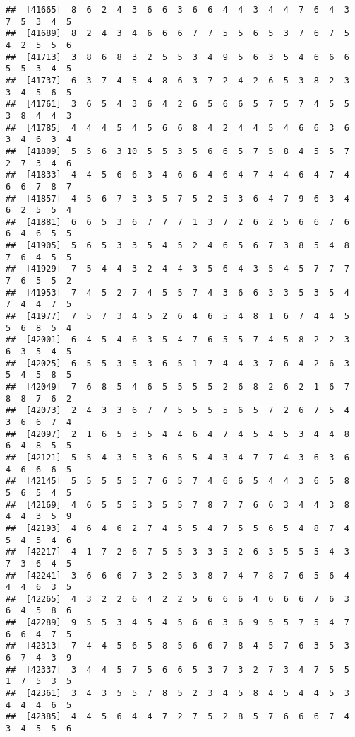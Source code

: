 \documentclass[
]{book}
\begin{document}
\begin{verbatim}
##  [41665]  8  6  2  4  3  6  6  3  6  6  4  4  3  4  4  7  6  4  3  7  5  3  4  5
##  [41689]  8  2  4  3  4  6  6  6  7  7  5  5  6  5  3  7  6  7  5  4  2  5  5  6
##  [41713]  3  8  6  8  3  2  5  5  3  4  9  5  6  3  5  4  6  6  6  5  5  3  4  5
##  [41737]  6  3  7  4  5  4  8  6  3  7  2  4  2  6  5  3  8  2  3  3  4  5  6  5
##  [41761]  3  6  5  4  3  6  4  2  6  5  6  6  5  7  5  7  4  5  5  3  8  4  4  3
##  [41785]  4  4  4  5  4  5  6  6  8  4  2  4  4  5  4  6  6  3  6  3  4  6  3  4
##  [41809]  5  5  6  3 10  5  5  3  5  6  6  5  7  5  8  4  5  5  7  2  7  3  4  6
##  [41833]  4  4  5  6  6  3  4  6  6  4  6  4  7  4  4  6  4  7  4  6  6  7  8  7
##  [41857]  4  5  6  7  3  3  5  7  5  2  5  3  6  4  7  9  6  3  4  6  2  5  5  4
##  [41881]  6  6  5  3  6  7  7  7  1  3  7  2  6  2  5  6  6  7  6  6  4  6  5  5
##  [41905]  5  6  5  3  3  5  4  5  2  4  6  5  6  7  3  8  5  4  8  7  6  4  5  5
##  [41929]  7  5  4  4  3  2  4  4  3  5  6  4  3  5  4  5  7  7  7  7  6  5  5  2
##  [41953]  7  4  5  2  7  4  5  5  7  4  3  6  6  3  3  5  3  5  4  7  4  4  7  5
##  [41977]  7  5  7  3  4  5  2  6  4  6  5  4  8  1  6  7  4  4  5  5  6  8  5  4
##  [42001]  6  4  5  4  6  3  5  4  7  6  5  5  7  4  5  8  2  2  3  6  3  5  4  5
##  [42025]  6  5  5  3  5  3  6  5  1  7  4  4  3  7  6  4  2  6  3  5  4  5  8  5
##  [42049]  7  6  8  5  4  6  5  5  5  5  2  6  8  2  6  2  1  6  7  8  8  7  6  2
##  [42073]  2  4  3  3  6  7  7  5  5  5  5  6  5  7  2  6  7  5  4  3  6  6  7  4
##  [42097]  2  1  6  5  3  5  4  4  6  4  7  4  5  4  5  3  4  4  8  6  4  8  5  5
##  [42121]  5  5  4  3  5  3  6  5  5  4  3  4  7  7  4  3  6  3  6  4  6  6  6  5
##  [42145]  5  5  5  5  5  7  6  5  7  4  6  6  5  4  4  3  6  5  8  5  6  5  4  5
##  [42169]  4  6  5  5  5  3  5  5  7  8  7  7  6  6  3  4  4  3  8  4  4  3  5  9
##  [42193]  4  6  4  6  2  7  4  5  5  4  7  5  5  6  5  4  8  7  4  5  4  5  4  6
##  [42217]  4  1  7  2  6  7  5  5  3  3  5  2  6  3  5  5  5  4  3  7  3  6  4  5
##  [42241]  3  6  6  6  7  3  2  5  3  8  7  4  7  8  7  6  5  6  4  4  4  6  3  5
##  [42265]  4  3  2  2  6  4  2  2  5  6  6  6  4  6  6  6  7  6  3  6  4  5  8  6
##  [42289]  9  5  5  3  4  5  4  5  6  6  3  6  9  5  5  7  5  4  7  6  6  4  7  5
##  [42313]  7  4  4  5  6  5  8  5  6  6  7  8  4  5  7  6  3  5  3  6  7  4  3  9
##  [42337]  3  4  4  5  7  5  6  6  5  3  7  3  2  7  3  4  7  5  5  1  7  5  3  5
##  [42361]  3  4  3  5  5  7  8  5  2  3  4  5  8  4  5  4  4  5  3  4  4  4  6  5
##  [42385]  4  4  5  6  4  4  7  2  7  5  2  8  5  7  6  6  6  7  4  3  4  5  5  6

\end{verbatim}
\end{document}
